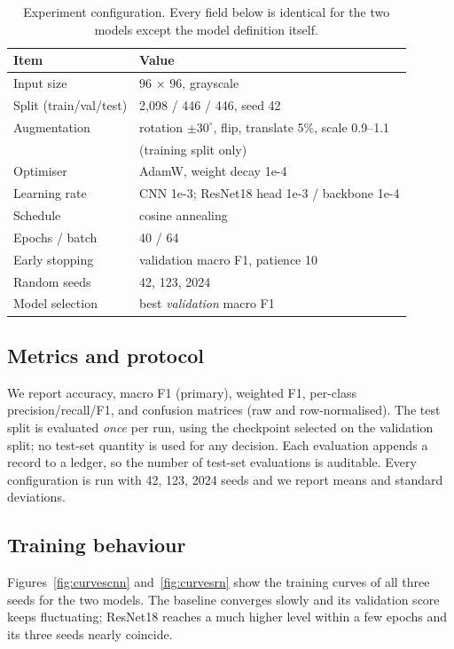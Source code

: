 \documentclass[sigconf, screen]{acmart}
\begin{document}
\begin{table}[t]
\caption{Experiment configuration. Every field below is identical for the two
models except the model definition itself.}
\label{tab:setup}
\small
\begin{tabular}{@{}ll@{}}
\toprule
Item & Value \\
\midrule
Input size & 96 $\times$ 96, grayscale \\
Split (train/val/test) & 2,098 / 446 / 446, seed 42 \\
Augmentation & rotation $\pm30^\circ$, flip, translate 5\%, scale 0.9--1.1 \\
 & (training split only) \\
Optimiser & AdamW, weight decay 1e-4 \\
Learning rate & CNN 1e-3; ResNet18 head 1e-3 / backbone 1e-4 \\
Schedule & cosine annealing \\
Epochs / batch & 40 / 64 \\
Early stopping & validation macro F1, patience 10 \\
Random seeds & 42, 123, 2024 \\
Model selection & best \emph{validation} macro F1 \\
\bottomrule
\end{tabular}
\end{table}

\subsection{Metrics and protocol}
We report accuracy, macro F1 (primary), weighted F1, per-class
precision/recall/F1, and confusion matrices (raw and row-normalised). The test
split is evaluated \emph{once} per run, using the checkpoint selected on the
validation split; no test-set quantity is used for any decision. Each evaluation
appends a record to a ledger, so the number of test-set evaluations is auditable.
Every configuration is run with 42, 123, 2024 seeds and we report means and standard
deviations.

\subsection{Training behaviour}
Figures~\ref{fig:curvescnn} and~\ref{fig:curvesrn} show the training curves of all
three seeds for the two models. The baseline converges slowly and its validation
score keeps fluctuating; ResNet18 reaches a much higher level within a few epochs
and its three seeds nearly coincide.
\end{document}
